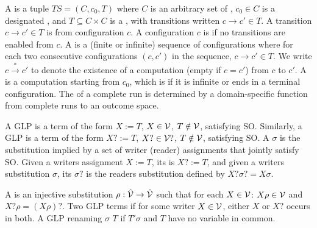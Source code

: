 \begin{definition}
\label{def:ts}
A  is a tuple $TS = (C, c_0, T)$ where $C$ is an arbitrary set of , $c_0 \in C$ is a designated , and $T \subseteq C \times C$ is a , with transitions written $c \rightarrow c' \in T$.
A transition $c \rightarrow c' \in T$ is  from configuration $c$. A configuration $c$ is  if no transitions are enabled from $c$. A  is a (finite or infinite) sequence of configurations where for each two consecutive configurations $(c,c')$ in the sequence, $c \rightarrow c' \in T$. We write $c \xrightarrow{*} c'$ to denote the existence of a computation (empty if $c = c'$) from $c$ to $c'$. A  is a computation starting from $c_0$, which is  if it is infinite or ends in a terminal configuration. The  of a complete run is determined by a domain-specific function from complete runs to an outcome space.
\end{definition}


\begin{definition}
\label{def:writers-assignment}
A GLP  is a term of the form $X := T$, $X\in\mathcal{V}$, $T\notin\mathcal{V}$, satisfying SO. Similarly, a GLP  is a term of the form $X? := T$, $X?\in\mathcal{V}?$, $T\notin\mathcal{V}$, satisfying SO. A  $\sigma$ is the substitution implied by a set of writer (reader) assignments that jointly satisfy SO. Given a writers assignment $X := T$, its  is $X? := T$, and given a writers substitution $\sigma$, its  $\sigma?$ is the readers substitution defined by $X?\sigma? = X\sigma$.
\end{definition}

\begin{definition}
\label{def:glp-renaming}
A  is an injective substitution $\rho: \hat{\mathcal{V}} \to \hat{\mathcal{V}}$ such that for each $X \in \mathcal{V}$: $X\rho \in \mathcal{V}$ and $X?\rho = (X\rho)?$. Two GLP terms  if for some writer $X \in \mathcal{V}$, either $X$ or $X?$ occurs in both. A GLP renaming $\sigma$  $T$ if $T'\sigma$ and $T$ have no variable in common.
\end{definition}

